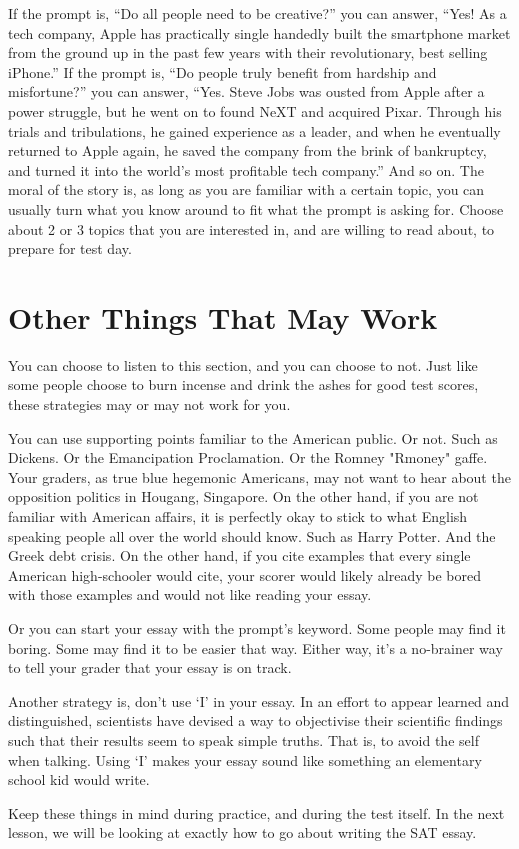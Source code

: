 \documentclass[DIV=calc,11pt,parskip,numbers=noenddot]{scrartcl} %
\begin{document}
If the prompt is, “Do all people need to be creative?” you can answer, “Yes! As a tech company, Apple has practically single handedly built the smartphone market from the ground up in the past few years with their revolutionary, best selling iPhone.” If the prompt is, “Do people truly benefit from hardship and misfortune?” you can answer, “Yes. Steve Jobs was ousted from Apple after a power struggle, but he went on to found NeXT and acquired Pixar. Through his trials and tribulations, he gained experience as a leader, and when he eventually returned to Apple again, he saved the company from the brink of bankruptcy, and turned it into the world’s most profitable tech company.” And so on. The moral of the story is, as long as you are familiar with a certain topic, you can usually turn what you know around to fit what the prompt is asking for. Choose about 2 or 3 topics that you are interested in, and are willing to read about, to prepare for test day.
\section{Other Things That May Work}
You can choose to listen to this section, and you can choose to not. Just like some people choose to burn incense and drink the ashes for good test scores, these strategies may or may not work for you.

You can use supporting points familiar to the American public. Or not. Such as Dickens. Or the Emancipation Proclamation. Or the Romney "Rmoney" gaffe. Your graders, as true blue hegemonic Americans, may not want to hear about the opposition politics in Hougang, Singapore. On the other hand, if you are not familiar with American affairs, it is perfectly okay to stick to what English speaking people all over the world should know. Such as Harry Potter. And the Greek debt crisis. On the other hand, if you cite examples that every single American high-schooler would cite, your scorer would likely already be bored with those examples and would not like reading your essay.

Or you can start your essay with the prompt’s keyword. Some people may find it boring. Some may find it to be easier that way. Either way, it’s a no-brainer way to tell your grader that your essay is on track.

Another strategy is, don’t use ‘I’ in your essay. In an effort to appear learned and distinguished, scientists have devised a way to objectivise their scientific findings such that their results seem to speak simple truths. That is, to avoid the self when talking. Using ‘I’ makes your essay sound like something an elementary school kid would write. 

Keep these things in mind during practice, and during the test itself. In the next lesson, we will be looking at exactly how to go about writing the SAT essay.
\end{document}
